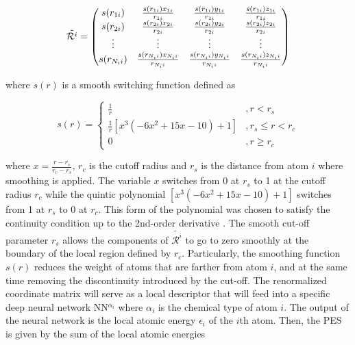 \begin{equation}
    \tilde{\mathcal{R}^i} =  \mqty( s(r_{1i}) &
    \frac{s(r_{1i}) x_{1i}}{r_{1i}}
    &	 \frac{s(r_{1i}) y_{1i}}{r_{1i}} &
    \frac{s(r_{1i}) z_{1i}}{r_{1i}} \\
    s(r_{2i}) &
    \frac{s(r_{2i}) x_{2i}}{r_{2i}}
    &	 \frac{s(r_{2i}) y_{2i}}{r_{2i}} &
    \frac{s(r_{2i}) z_{2i}}{r_{2i}}
    \\ \vdots & \vdots & \vdots
    &
    \vdots \\
    s(r_{N_i i}) &
    \frac{s(r_{N_i i}) x_{N_i i}}{r_{N_i i}}
    &	 \frac{s(r_{N_i i}) y_{N_i i}}{r_{N_i i}} &
    \frac{s(r_{N_i i}) z_{N_i i}}{r_{N_i i}} )
\end{equation}

where $s(r)$ is a smooth switching function defined as

\begin{equation}
    s(r) = \begin{cases}
        \frac{1}{r}                                   & , r   < r_s        \\
        \frac{1}{r} \left[x^3 (-6x^2+15x-10)+1\right] & , r_s \leq r < r_c \\
        0                                             & , r   \geq r_c
    \end{cases}
\end{equation}

where $x = \frac{r- r_s}{r_c-r_s}$, $r_c$ is the cutoff radius and $r_s$ is the
distance from atom $i$ where smoothing is applied. The variable $x$ switches from 0 at $r_s$ to 1 at the cutoff radius $r_c$ while the quintic polynomial $\left[x^3 (-6x^2+15x-10)+1\right]$ switches from 1 at $r_s$ to 0 at $r_c$. This form of the polynomial was chosen to satisfy the continuity condition up to the 2nd-order derivative \cite{zeng2023deepmd}. The	smooth cut-off
parameter $r_s$ allows the components of $\tilde{\mathcal{R}^i}$ to
go to zero smoothly at the boundary of the local region defined by $r_c$.
Particularly, the smoothing function $s(r)$ reduces the weight of atoms that
are farther from atom $i$, and at the same time removing the discontinuity
introduced by the cut-off. The renormalized coordinate matrix will serve as a
local descriptor that will feed into a specific deep neural network
NN$^{\alpha_i}$ where $\alpha_i$ is the chemical type of atom $i$. The output
of the neural network is the local atomic energy $\epsilon_i$ of the $i$th
atom. Then, the PES is given by the sum of the local atomic energies

